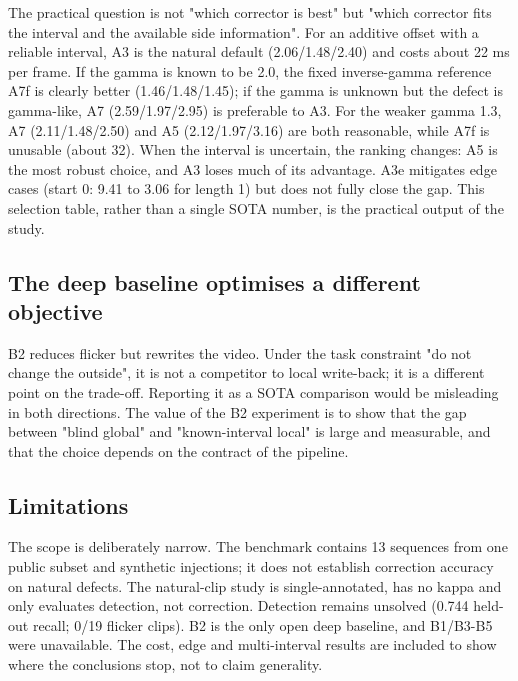 \documentclass[twocolumn,10pt]{svjour3}
\begin{document}
The practical question is not "which corrector is best" but "which corrector fits the interval and the available side information". For an additive offset with a reliable interval, A3 is the natural default (2.06/1.48/2.40) and costs about 22 ms per frame. If the gamma is known to be 2.0, the fixed inverse-gamma reference A7f is clearly better (1.46/1.48/1.45); if the gamma is unknown but the defect is gamma-like, A7 (2.59/1.97/2.95) is preferable to A3. For the weaker gamma 1.3, A7 (2.11/1.48/2.50) and A5 (2.12/1.97/3.16) are both reasonable, while A7f is unusable (about 32). When the interval is uncertain, the ranking changes: A5 is the most robust choice, and A3 loses much of its advantage. A3e mitigates edge cases (start 0: 9.41 to 3.06 for length 1) but does not fully close the gap. This selection table, rather than a single SOTA number, is the practical output of the study.


\subsection{The deep baseline optimises a different objective}

B2 reduces flicker but rewrites the video. Under the task constraint "do not change the outside", it is not a competitor to local write-back; it is a different point on the trade-off. Reporting it as a SOTA comparison would be misleading in both directions. The value of the B2 experiment is to show that the gap between "blind global" and "known-interval local" is large and measurable, and that the choice depends on the contract of the pipeline.


\subsection{Limitations}

The scope is deliberately narrow. The benchmark contains 13 sequences from one public subset and synthetic injections; it does not establish correction accuracy on natural defects. The natural-clip study is single-annotated, has no kappa and only evaluates detection, not correction. Detection remains unsolved (0.744 held-out recall; 0/19 flicker clips). B2 is the only open deep baseline, and B1/B3-B5 were unavailable. The cost, edge and multi-interval results are included to show where the conclusions stop, not to claim generality.
\end{document}
